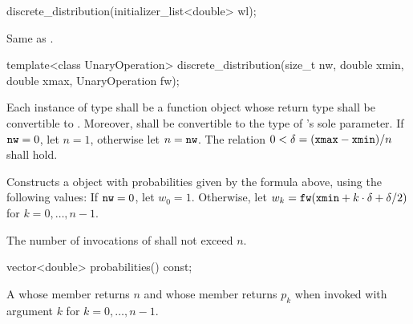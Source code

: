 %
\begin{itemdecl}
discrete_distribution(initializer_list<double> wl);
\end{itemdecl}

\begin{itemdescr}
\pnum\effects
 Same as .
\end{itemdescr}

\begin{itemdecl}
template<class UnaryOperation>
  discrete_distribution(size_t nw, double xmin, double xmax, UnaryOperation fw);
\end{itemdecl}

\begin{itemdescr}
\pnum\requires
 Each instance of type 
 shall be a function object
 whose return type shall be convertible to .
 Moreover,
  shall be convertible
 to the type of 's sole parameter.
 If $\texttt{nw} = 0$, let $n = 1$, otherwise let $n = \texttt{nw}$.
 The relation
   $0 < \delta = (\texttt{xmax} - \texttt{xmin}) / n$
 shall hold.

\pnum\effects Constructs a  object
 with probabilities given by the formula above,
 using the following values:
 If $\texttt{nw} = 0$,
 let $w_0 = 1$.
 Otherwise,
 let $w_k = \texttt{fw}(\texttt{xmin} + k \cdot \delta + \delta / 2)$
 for $k = 0, \dotsc, n - 1$.

\pnum\complexity
 The number of invocations of  shall not exceed $n$.
\end{itemdescr}

%
\begin{itemdecl}
vector<double> probabilities() const;
\end{itemdecl}

\begin{itemdescr}
\pnum\returns A 
 whose  member returns $n$
 and whose  member returns $p_k$
 when invoked with argument $k$ for $k = 0, \dotsc, n - 1$.
\end{itemdescr}




